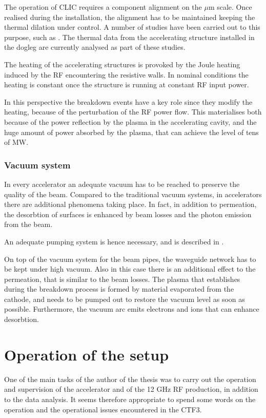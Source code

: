 The operation of CLIC requires a component alignment on the $\mu$m scale. Once realised during the installation, the alignment has to be maintained keeping the thermal dilation under control. A number of studies have been carried out to this purpose, such as \cite{Daskalaki:2141828}. The thermal data from the accelerating structure installed in the dogleg are currently analysed as part of these studies.

The heating of the accelerating structures is provoked by the Joule heating induced by the RF encountering the resistive walls. In nominal conditions the heating is constant once the structure is running at constant RF input power. 

In this perspective the breakdown events have a key role since they modify the heating, because of the perturbation of the RF power flow. This materialises both because of the power reflection by the plasma in the accelerating cavity, and the huge amount of power absorbed by the plasma, that can achieve the level of tens of MW.


\subsubsection{Vacuum system}

In every accelerator an adequate vacuum has to be reached to preserve the quality of the beam. Compared to the traditional vacuum systems, in accelerators there are additional phenomena taking place. In fact, in addition to permeation, the desorbtion of surfaces is enhanced by beam losses and the photon emission from the beam. 

An adequate pumping system is hence necessary, and is described in \cite{ctf3:dr}.

On top of the vacuum system for the beam pipes, the waveguide network has to be kept under high vacuum. Also in this case there is an additional effect to the permeation, that is similar to the beam losses. The plasma that establishes during the breakdown process is formed by material evaporated from the cathode, and needs to be pumped out to restore the vacuum level as soon as possible. Furthermore, the vacuum arc emits electrons and ions that can enhance desorbtion.


\section[Operation of the setup]{Operation of the setup}

One of the main tasks of the author of the thesis was to carry out the operation and supervision of the accelerator and of the 12 GHz RF production, in addition to the data analysis. It seems therefore appropriate to spend some words on the operation and the operational issues encountered in the CTF3.

